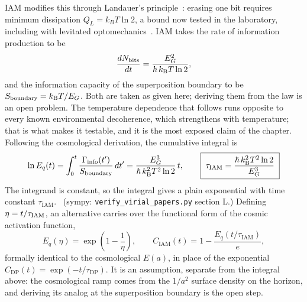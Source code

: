 IAM modifies this through Landauer's principle~\cite{Landauer1961}: erasing one bit requires minimum dissipation $Q_L=k_BT\ln2$, a bound now tested in the
laboratory, including with levitated optomechanics~\cite{Berut2012,Ciampini2025}. IAM takes the rate of information production to be
\begin{equation}
 \frac{dN_{\mathrm{bits}}}{dt}=\frac{E_G^2}{\hbar\,k_{\mathrm B} T\ln2},\label{eq:gd_bitrate}
\end{equation}
and the information capacity of the superposition boundary to be $S_{\mathrm{boundary}}=k_{\mathrm B} T/E_G$. Both are taken as given here; deriving them from the law is an open problem.
\conjecture{} The temperature dependence that follows runs opposite to every known environmental decoherence, which strengthens with temperature; that is
what makes it testable, and it is the most exposed claim of the chapter. Following the cosmological derivation, the cumulative integral is
\begin{equation}
 \ln E_q(t)=\int_0^t\frac{\Gamma_{\mathrm{info}}(t')}{S_{\mathrm{boundary}}}\,dt'=\frac{E_G^3}{\hbar\,k_{\mathrm B}^2T^2\ln2}\,t,\qquad
 \boxed{\;\tau_{\mathrm{IAM}}=\frac{\hbar\,k_{\mathrm B}^2T^2\ln2}{E_G^3}\;}
 \label{eq:tauIAM}
\end{equation}
The integrand is constant, so the integral gives a plain exponential with time constant $\tau_{\mathrm{IAM}}$. \derived\ (sympy: \texttt{verify\_virial\_papers.py}
section L.) Defining $\eta=t/\tau_{\rm IAM}$, an alternative carries over the functional form of the cosmic activation function,
\begin{equation}
 E_q(\eta)=\exp\!\left(1-\frac1\eta\right),\qquad C_{\mathrm{IAM}}(t)=1-\frac{E_q(t/\tau_{\mathrm{IAM}})}{e},\label{eq:gd_ramp}
\end{equation}
formally identical to the cosmological $E(a)$, in place of the exponential $C_{\mathrm{DP}}(t)=\exp(-t/\tau_{\mathrm{DP}})$. It is an assumption, separate from the integral above: the cosmological ramp comes from the $1/a^2$ surface density on the horizon, and deriving its analog at the superposition boundary is the open step. \conjecture\ \openprob

